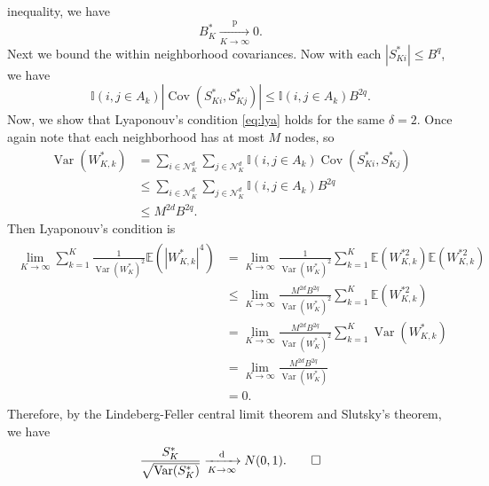 \documentclass[12pt,twoside]{reedthesis}
\theoremstyle{definition}
\theoremstyle{definition}
\theoremstyle{remark}
\begin{document}
inequality, we have
\begin{equation*}
B^{\ast}_{K} \xrightarrow[K \to \infty]{\mathrm{p}} 0.
\end{equation*}
Next we bound the within neighborhood covariances. Now with each
\(|S^{\ast}_{Ki}| \leq B^{q}\), we have
\begin{equation}
  \mathbb{I}(i, j \in A_{k}) \left| \operatorname{Cov}(S^{\ast}_{Ki}, S^{\ast}_{Kj}) \right| \leq \mathbb{I}(i, j \in A_{k}) B^{2q}.
\end{equation}
Now, we show that Lyaponouv's condition \eqref{eq:lya} holds for the same
\(\delta = 2\). Once again note that each neighborhood has at most \(M\)
nodes, so
\begin{align*}
\operatorname{Var}(W^{\ast}_{K,k}) &= \sum_{i \in \mathcal{N}_{K}^d} \sum_{j \in \mathcal{N}_{K}^d} \mathbb{I}(i,j \in A_{k}) \operatorname{Cov}(S^{\ast}_{Ki}, S^{\ast}_{Kj}) \\
    &\leq \sum_{i \in \mathcal{N}_{K}^d} \sum_{j \in \mathcal{N}_{K}^d} \mathbb{I}(i,j \in A_{k}) B^{2q} \\
    &\leq M^{2d}B^{2q}.
\end{align*}
Then Lyaponouv's condition is
\begin{align}
    \begin{split}
    \lim_{K \to \infty} \sum_{k = 1}^{K} \frac{1}{\operatorname{Var}(W^{\ast}_{K})^2} \mathbb{E}(|W^{\ast}_{K,k}|^{4}) &= \lim_{K \to \infty} \frac{1}{\operatorname{Var}(W^{\ast}_{K})^2} \sum_{k = 1}^{K}  \mathbb{E}(W^{\ast 2}_{K,k}) \mathbb{E}(W^{\ast 2}_{K,k}) \\
    &\leq \lim_{K \to \infty} \frac{M^{2d}B^{2q}}{\operatorname{Var}(W^{\ast}_{K})^2} \sum_{k = 1}^{K} \mathbb{E}(W^{\ast 2}_{K,k}) \\
    &= \lim_{K \to \infty} \frac{M^{2d}B^{2q}}{\operatorname{Var}(W^{\ast}_{K})^2} \sum_{k = 1}^{K} \operatorname{Var}(W^{\ast}_{K,k}) \\
    &= \lim_{K \to \infty} \frac{M^{2d}B^{2q}}{\operatorname{Var}(W^{\ast}_{K})} \label{eq:Lya} \\
    &= 0.
  \end{split}
\end{align}
Therefore, by the Lindeberg-Feller central limit theorem and Slutsky's
theorem, we have
\begin{equation*}
\frac{S_{K}^{\ast}}{\sqrt{\operatorname{Var}(S_{K}^{\ast})}} \xrightarrow[K \to \infty]{\mathrm{d}} N(0,1).\qedhere
\end{equation*}
\end{document}
